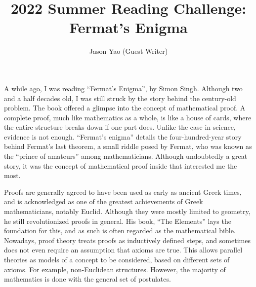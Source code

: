 \documentclass{article}
\title{2022 Summer Reading Challenge: Fermat’s Enigma}
\author{Jason Yao (Guest Writer)}
\begin{document}
A while ago, I was reading “Fermat’s Enigma”, by Simon Singh. Although two and a half decades old, I was still struck by the story behind the century-old problem. The book offered a glimpse into the concept of mathematical proof. A complete proof, much like mathematics as a whole, is like a house of cards, where the entire structure breaks down if one part does. Unlike the case in science, evidence is not enough. “Fermat’s enigma” details the four-hundred-year story behind Fermat’s last theorem, a small riddle posed by Fermat, who was known as the “prince of amateurs” among mathematicians. Although undoubtedly a great story, it was the concept of mathematical proof inside that interested me the most.

Proofs are generally agreed to have been used as early as ancient Greek times, and is acknowledged as one of the greatest achievements of Greek mathematicians, notably Euclid. Although they were mostly limited to geometry, he still revolutionized proofs in general. His book, “The Elements” lays the foundation for this, and as such is often regarded as the mathematical bible. Nowadays, proof theory treats proofs as inductively defined steps, and sometimes does not even require an assumption that axioms are true. This allows parallel theories as models of a concept to be considered, based on different sets of axioms. For example, non-Euclidean structures. However, the majority of mathematics is done with the general set of postulates.
\end{document}

